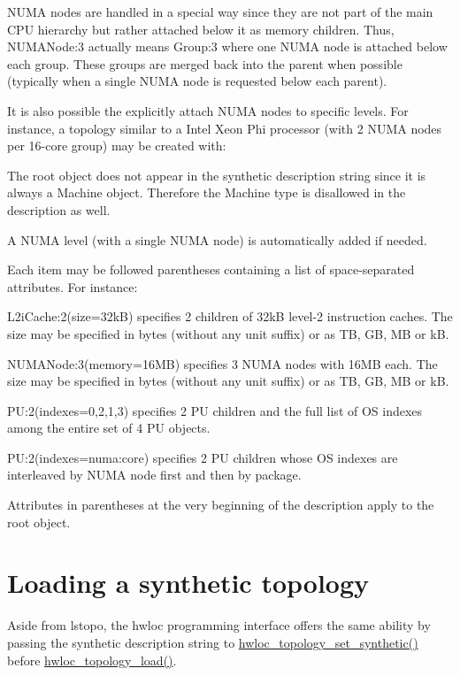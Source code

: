 N\+U\+MA nodes are handled in a special way since they are not part of the main C\+PU hierarchy but rather attached below it as memory children. Thus, {\ttfamily N\+U\+M\+A\+Node\+:3} actually means {\ttfamily Group\+:3} where one N\+U\+MA node is attached below each group. These groups are merged back into the parent when possible (typically when a single N\+U\+MA node is requested below each parent).

It is also possible the explicitly attach N\+U\+MA nodes to specific levels. For instance, a topology similar to a Intel Xeon Phi processor (with 2 N\+U\+MA nodes per 16-\/core group) may be created with\+: 


The root object does not appear in the synthetic description string since it is always a Machine object. Therefore the Machine type is disallowed in the description as well.

A N\+U\+MA level (with a single N\+U\+MA node) is automatically added if needed.

Each item may be followed parentheses containing a list of space-\/separated attributes. For instance\+: 
\begin{DoxyItemize}
\item {\ttfamily L2i\+Cache\+:2(size=32kB)} specifies 2 children of 32kB level-\/2 instruction caches. The size may be specified in bytes (without any unit suffix) or as TB, GB, MB or kB.  
\item {\ttfamily N\+U\+M\+A\+Node\+:3(memory=16\+MB)} specifies 3 N\+U\+MA nodes with 16\+MB each. The size may be specified in bytes (without any unit suffix) or as TB, GB, MB or kB.  
\item {\ttfamily PU\+:2(indexes=0,2,1,3)} specifies 2 PU children and the full list of OS indexes among the entire set of 4 PU objects.  
\item {\ttfamily PU\+:2(indexes=numa\+:core)} specifies 2 PU children whose OS indexes are interleaved by N\+U\+MA node first and then by package.  
\item Attributes in parentheses at the very beginning of the description apply to the root object.  
\end{DoxyItemize}

 \hypertarget{a00389_synthetic_use}{}\section{Loading a synthetic topology}\label{a00389_synthetic_use}
Aside from lstopo, the hwloc programming interface offers the same ability by passing the synthetic description string to \hyperlink{a00192_ga4fab186bb6181a00bcf585825fddd38d}{hwloc\+\_\+topology\+\_\+set\+\_\+synthetic()} before \hyperlink{a00186_gabdf58d87ad77f6615fccdfe0535ff826}{hwloc\+\_\+topology\+\_\+load()}.

